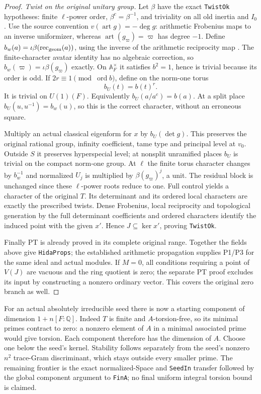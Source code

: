 \begin{proof}
\emph{Twist on the original unitary group.}
Let $\beta$ have the exact \texttt{TwistOk} hypotheses: finite
$\ell$-power order, $\beta^c=\beta^{-1}$, and triviality on all old
inertia and $I_0$.  Use the source convention
$v(\operatorname{art}g)=-\deg g$: arithmetic Frobenius maps to an
inverse uniformizer, whereas $\operatorname{art}(g_\varpi)=\varpi$
has degree $-1$.  Define
$b_w(a)=\iota\beta(\operatorname{rec}_{\rm geom}(a))$, using the
inverse of the arithmetic reciprocity map
\cite[V.5.2--5.3]{SelmerFamiliesCFT}.
The finite-character avatar identity has no algebraic correction,
so $b_w(\varpi)=\iota\beta(g_\varpi)$ exactly.
On $\mathbb A_F^\times$ it satisfies $b^2=1$, hence is
trivial because its order is odd.  If $2r\equiv1\pmod{\operatorname{ord}b}$,
define on the norm-one torus
\[
                 b_U(t)=b(t)^r.                                  \tag{OF9}
\]
It is trivial on $U(1)(F)$.  Equivalently $b_U(a/a^c)=b(a)$.
At a split place $b_U(u,u^{-1})=b_w(u)$, so this is the correct
character, without an erroneous square.

Multiply an actual classical eigenform for $x$ by $b_U(\det g)$.
This preserves the original rational group, infinity coefficient,
tame type and principal level at $v_0$.  Outside $S$ it preserves
hyperspecial level; at nonsplit unramified places $b_U$ is trivial
on the compact norm-one group.  At $\ell$ the finite torus character
changes by $b_w^{-1}$ and normalized $U_j$ is multiplied by
$\beta(g_\varpi)^j$, a unit.  The residual block is unchanged since
these $\ell$-power roots reduce to one.  Full control yields a
character of the original $T$.  Its determinant and its ordered
local characters are exactly the prescribed twists.  Dense Frobenius,
local reciprocity and topological generation by the full determinant
coefficients and ordered characters identify the induced point with
the given $x'$.  Hence $J\subseteq\ker x'$, proving \texttt{TwistOk}.

Finally PT is already proved in its complete original range.
Together the fields above give \texttt{HidaProps}; the established
arithmetic propagation supplies P1/P3 for the same ideal and actual
modules.  If $M=0$, all conditions requiring a point of $V(J)$ are
vacuous and the ring quotient is zero; the separate PT proof excludes
its input by constructing a nonzero ordinary vector.  This covers
the original zero branch as well.
\end{proof}

For an actual absolutely irreducible seed there is now a starting
component of dimension $1+n[F:\mathbb Q]$.  Indeed $T$ is finite and
$A$-torsion-free, so its minimal primes contract to zero: a nonzero
element of $A$ in a minimal associated prime would give torsion.
Each component therefore has the dimension of $A$.  Choose one below
the seed's kernel.  Stability follows separately from the seed's
nonzero $n^2$ trace-Gram discriminant, which stays outside every
smaller prime.  The remaining frontier is the exact normalized-Space
and \texttt{SeedIn} transfer followed by the global component argument
to \texttt{FinA}; no final uniform integral torsion bound is claimed.
